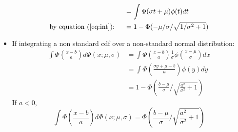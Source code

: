 \documentclass[12pt]{article}
\begin{document}
\begin{itemize}
\begin{align*}
    & = \int \Phi(\sigma t + \mu)\phi(t) dt \\
    \text{by equation (\ref{eq:int}): } \quad & = 1 -
    \Phi(-\mu/\sigma/\sqrt{1/\sigma^2+1})
  \end{align*}
\item If integrating a non standard cdf over a non-standard normal
  distribution:
  \begin{align}
    \int \Phi \left( \frac{x-b}{a} \right) d\Phi(x; \mu, \sigma) & = \int \Phi \left( \frac{x-b}{a} \right) \frac{1}{\sigma} \phi \left( \frac{x-\mu}{\sigma} \right) dx \nonumber\\
    &= \int \Phi \left( \frac{\sigma y + \mu - b}{a}  \right) \phi(y) dy \nonumber \\
    \label{eq:intg1}
    & = 1- \Phi \left( \frac{b-\mu}{\sigma} / \sqrt{\frac{a^2}{\sigma^2}+1} \right)
  \end{align}
  If $a < 0$,
  \begin{equation}
    \label{eq:intg2}
    \int \Phi \left( \frac{x-b}{a} \right) d\Phi(x; \mu, \sigma) = \Phi \left( \frac{b-\mu}{\sigma} / \sqrt{\frac{a^2}{\sigma^2}+1} \right)
  \end{equation}

\end{itemize}
\end{document}
